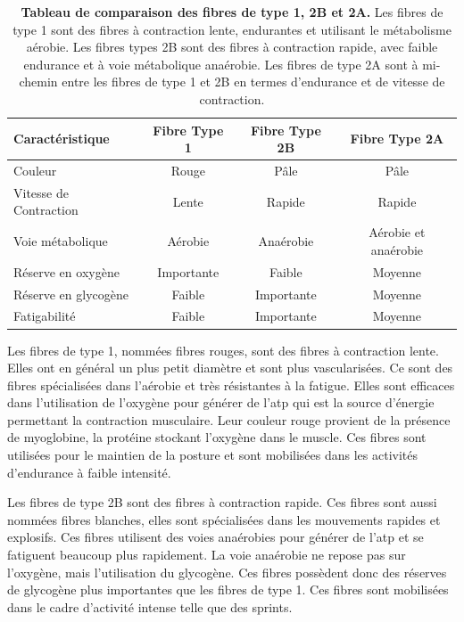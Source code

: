 \begin{table}[htbp]
\centering
\begin{tabular}{|l|c|c|c|} 
 \hline
 \textbf{Caractéristique} & \textbf{Fibre Type 1} & \textbf{Fibre Type 2B} & \textbf{Fibre Type 2A} \\
 \hline
Couleur & Rouge & Pâle & Pâle \\
Vitesse de Contraction & Lente & Rapide & Rapide \\
Voie métabolique & Aérobie & Anaérobie & Aérobie et anaérobie \\
Réserve en oxygène & Importante & Faible & Moyenne \\
Réserve en glycogène & Faible & Importante & Moyenne \\
Fatigabilité & Faible & Importante & Moyenne \\
 \hline
\end{tabular}
\caption[Tableau de comparaison des fibres de type 1, 2B et 2A.]{\textbf{Tableau de comparaison des fibres de type 1, 2B et 2A.} Les fibres de type 1 sont des fibres à contraction lente, endurantes et utilisant le métabolisme aérobie. Les fibres types 2B sont des fibres à contraction rapide, avec faible endurance et à voie métabolique anaérobie. Les fibres de type 2A sont à mi-chemin entre les fibres de type 1 et 2B en termes d'endurance et de vitesse de contraction.}
\label{table:fiber-compare}
\end{table}

Les fibres de type 1, nommées fibres rouges, sont des fibres à contraction lente. Elles ont en général un plus petit diamètre et sont plus vascularisées. Ce sont des fibres spécialisées dans l'aérobie et très résistantes à la fatigue. Elles sont efficaces dans l'utilisation de l'oxygène pour générer de l'\gls{atp} qui est la source d'énergie permettant la contraction musculaire. Leur couleur rouge provient de la présence de myoglobine, la protéine stockant l'oxygène dans le muscle. Ces fibres sont utilisées pour le maintien de la posture et sont mobilisées dans les activités d'endurance à faible intensité.

Les fibres de type 2B sont des fibres à contraction rapide. Ces fibres sont aussi nommées fibres blanches, elles sont spécialisées dans les mouvements rapides et explosifs. Ces fibres utilisent des voies anaérobies pour générer de l'\gls{atp} et se fatiguent beaucoup plus rapidement. La voie anaérobie ne repose pas sur l'oxygène, mais l'utilisation du glycogène. Ces fibres possèdent donc des réserves de glycogène plus importantes que les fibres de type 1. Ces fibres sont mobilisées dans le cadre d'activité intense telle que des sprints.

